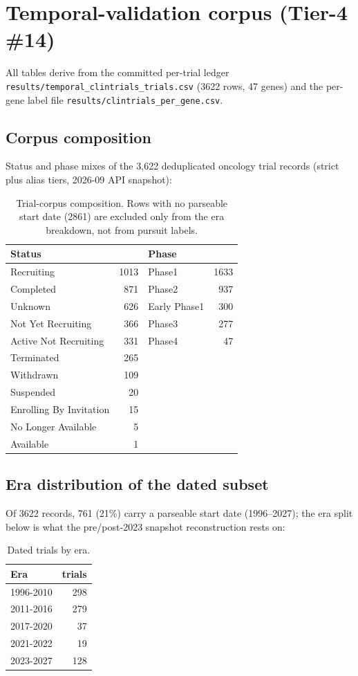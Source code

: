\section{Temporal-validation corpus (Tier-4 \#14)}
All tables derive from the committed per-trial ledger \texttt{results/temporal\_clintrials\_trials.csv} (3622 rows, 47 genes) and the per-gene label file \texttt{results/clintrials\_per\_gene.csv}.
\subsection{Corpus composition}
Status and phase mixes of the 3{,}622 deduplicated oncology trial records (strict plus alias tiers, 2026-09 API snapshot):
\begin{table}[h]\centering\small
\caption{Trial-corpus composition. Rows with no parseable start date (2861) are excluded only from the era breakdown, not from pursuit labels.}\label{tab:trialcorpus}
\begin{tabular}{lr@{\hspace{2em}}lr}\hline\hline
\multicolumn{2}{l}{Status} & \multicolumn{2}{l}{Phase}\\\hline
Recruiting & 1013 & Phase1 & 1633\\
Completed & 871 & Phase2 & 937\\
Unknown & 626 & Early Phase1 & 300\\
Not Yet Recruiting & 366 & Phase3 & 277\\
Active Not Recruiting & 331 & Phase4 & 47\\
Terminated & 265 & &\\
Withdrawn & 109 & &\\
Suspended & 20 & &\\
Enrolling By Invitation & 15 & &\\
No Longer Available & 5 & &\\
Available & 1 & &\\
\hline\end{tabular}\end{table}
\subsection{Era distribution of the dated subset}
Of 3622 records, 761 (21\%) carry a parseable start date (1996--2027); the era split below is what the pre/post-2023 snapshot reconstruction rests on:
\begin{table}[h]\centering\small\caption{Dated trials by era.}\label{tab:trialera}
\begin{tabular}{lr}\hline\hline Era & trials\\\hline
1996-2010 & 298\\
2011-2016 & 279\\
2017-2020 & 37\\
2021-2022 & 19\\
2023-2027 & 128\\
\hline\end{tabular}\end{table}
